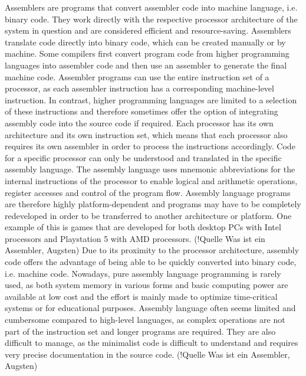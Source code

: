 Assemblers are programs that convert assembler code into machine language, i.e. binary code. They work directly with the respective processor architecture of the system in question and are considered efficient and resource-saving. Assemblers translate code directly into binary code, which can be created manually or by machine. Some compilers first convert program code from higher programming languages into assembler code and then use an assembler to generate the final machine code.
Assembler programs can use the entire instruction set of a processor, as each assembler instruction has a corresponding machine-level instruction. In contrast, higher programming languages are limited to a selection of these instructions and therefore sometimes offer the option of integrating assembly code into the source code if required.
Each processor has its own architecture and its own instruction set, which means that each processor also requires its own assembler in order to process the instructions accordingly. Code for a specific processor can only be understood and translated in the specific assembly language. The assembly language uses mnemonic abbreviations for the internal instructions of the processor to enable logical and arithmetic operations, register accesses and control of the program flow. Assembly language programs are therefore highly platform-dependent and programs may have to be completely redeveloped in order to be transferred to another architecture or platform. One example of this is games that are developed for both desktop PCs with Intel processors and Playstation 5 with AMD processors. (!Quelle Was ist ein Assembler, Augsten)
Due to its proximity to the processor architecture, assembly code offers the advantage of being able to be quickly converted into binary code, i.e. machine code. 
Nowadays, pure assembly language programming is rarely used, as both system memory in various forms and basic computing power are available at low cost and the effort is mainly made to optimize time-critical systems or for educational purposes. Assembly language often seems limited and cumbersome compared to high-level languages, as complex operations are not part of the instruction set and longer programs are required. They are also difficult to manage, as the minimalist code is difficult to understand and requires very precise documentation in the source code. (!Quelle Was ist ein Assembler, Augsten)